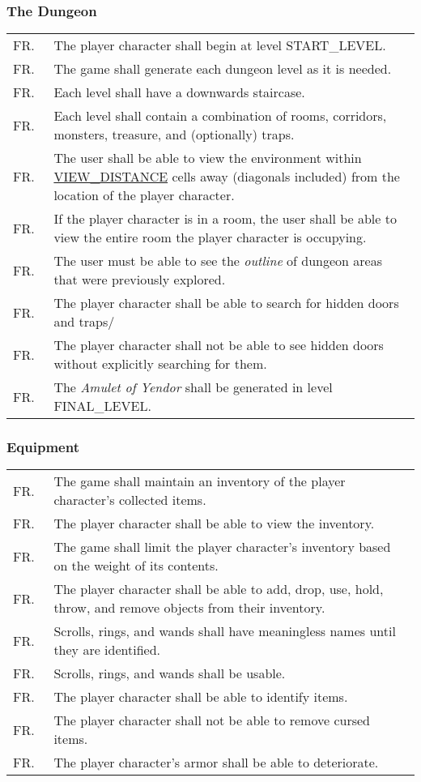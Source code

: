 \documentclass[12pt, titlepage]{article}
\newcounter{FRCounter}
\newcommand{\freq}[1]{
	\hfill\stepcounter{FRCounter}FR.\textbf{\theFRCounter}
	& #1
}
\begin{document}
		\subsubsection{The Dungeon}
			\begin{tabular}{p{0.1\linewidth}p{0.9\linewidth}}
				\freq{The player character shall begin at level START\_LEVEL.}\\
				\freq{The game shall generate each dungeon level as it is needed.}\\
				\freq{Each level shall have a downwards staircase.}\\
				\freq{Each level shall contain a combination of rooms, corridors, monsters, treasure, and (optionally) traps.}\\
				\freq{The user shall be able to view the environment within \hyperref[symbolicParameters]{VIEW\_DISTANCE} cells away (diagonals included) from the location of the player character.}\\
				\freq{If the player character is in a room, the user shall be able to view the entire room the player character is occupying.}\\
				\freq{The user must be able to see the \textit{outline} of dungeon areas that were previously explored.}\\
				\freq{The player character shall be able to search for hidden doors and traps/}\\
				\freq{The player character shall not be able to see hidden doors without explicitly searching for them.}\\
				\freq{The \textit{Amulet of Yendor} shall be generated in level FINAL\_LEVEL.}\\
			\end{tabular}

		\subsubsection{Equipment}
			\begin{tabular}{p{0.1\linewidth}p{0.9\linewidth}}
				\freq{The game shall maintain an inventory of the player character's collected items.}\\
				\freq{The player character shall be able to view the inventory.}\\
				\freq{The game shall limit the player character's inventory based on the weight of its contents.}\\
				\freq{The player character shall be able to add, drop, use, hold, throw, and remove objects from their inventory.}\\
				\freq{Scrolls, rings, and wands shall have meaningless names until they are identified.}\\
				\freq{Scrolls, rings, and wands shall be usable.}\\
				\freq{The player character shall be able to identify items.}\\
				\freq{The player character shall not be able to remove cursed items.}\\
				\freq{The player character's armor shall be able to deteriorate.}\\
			\end{tabular}
\end{document}
